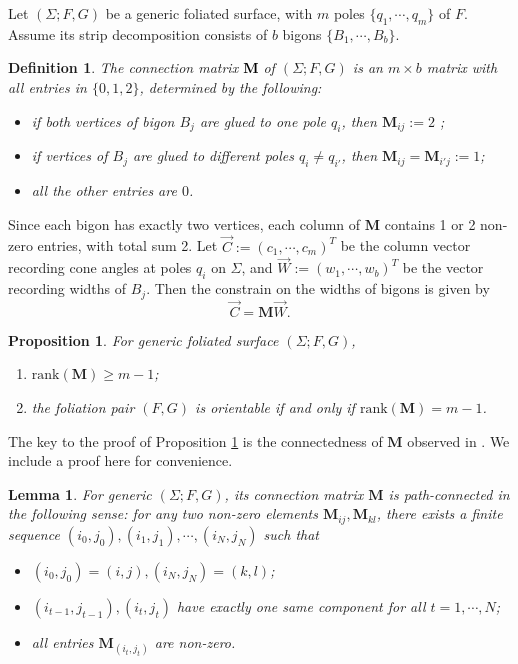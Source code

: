 \documentclass[pdflatex,sn-mathphys]{sn-jnl}%
\numberwithin{equation}{section}
\theoremstyle{thmstyleone}%
\newtheorem{proposition}[theorem]{Proposition}%
\newtheorem{definition}[theorem]{Definition}
\newtheorem{lemma}[theorem]{Lemma}
\newcommand{\SYM}{\textcolor{black}}
\newcommand{\DEF}{\emph}
\begin{document}
Let $(\Sigma;F,G)$ be a generic foliated surface, with $m$ poles $\{q_1,\cdots, q_m\}$ of $F$. Assume its strip decomposition consists of $b$ bigons $\{B_1, \cdots, B_b\}$.
\newcommand{\mtxM}{\mathbf{M}}
\begin{definition}
\label{def:cnnct_mtr}
    The \DEF{connection matrix} \SYM{$\mtxM$} of $(\Sigma;F,G)$ is an $m \times b$ matrix with all entries in $\{0,1,2\}$, determined by the following:
    \begin{itemize}
        \item if both vertices of bigon $B_j$ are glued to one pole $q_i$, then $\mtxM_{ij}:=2$ ;
        \item if vertices of $B_j$ are glued to different poles $q_i\neq q_{i'}$, then $\mtxM_{ij}=\mtxM_{i'j}:=1$;
        \item all the other entries are $0$.
    \end{itemize}
\end{definition}


Since each bigon has exactly two vertices, each column of $\mtxM$ contains 1 or 2 non-zero entries, with total sum 2.
Let $\vec{C}:=(c_1, \cdots, c_m)^T$ be the column vector recording cone angles at poles $q_i$ on $\Sigma$, and $\vec{W}:=(w_1, \cdots, w_b)^T$ be the vector recording widths of $B_j$. Then the constrain on the widths of bigons is given by
\begin{equation}\label{eq:width_constrain}
    \vec{C} = \mtxM  \vec{W}.
\end{equation}

\newcommand{\rank}{\mathrm{rank}}
\newcommand{\rankM}{\mathrm{rank}(\mtxM)}
\begin{proposition}\label{prop:rank} For generic foliated surface $(\Sigma;F,G)$, 
\begin{enumerate}
    \item $\rankM \geq m-1$;
    \item the foliation pair $(F,G)$ is orientable if and only if $\rankM = m-1$.
\end{enumerate} \end{proposition}

The key to the proof of Proposition \ref{prop:rank} is the connectedness of $\mtxM$ observed in \cite{Li19}. We include a proof here for convenience.
\begin{lemma}
    For generic $(\Sigma;F,G)$, its connection matrix $\mtxM$ is path-connected in the following sense: for any two non-zero elements $\mtxM_{ij}, \mtxM_{kl}$, there exists a finite sequence $(i_0,j_0), (i_1,j_1), \cdots, (i_N, j_N)$ such that
    \begin{itemize}
        \item $(i_0,j_0)=(i,j), (i_N, j_N)=(k,l)$;
        \item $(i_{t-1},j_{t-1}), (i_{t},j_{t})$ have exactly one same component for all $t=1,\cdots,N$;
        \item all entries $\mtxM_{(i_{t},j_{t})}$ are non-zero.
    \end{itemize}
\end{lemma}
\end{document}
